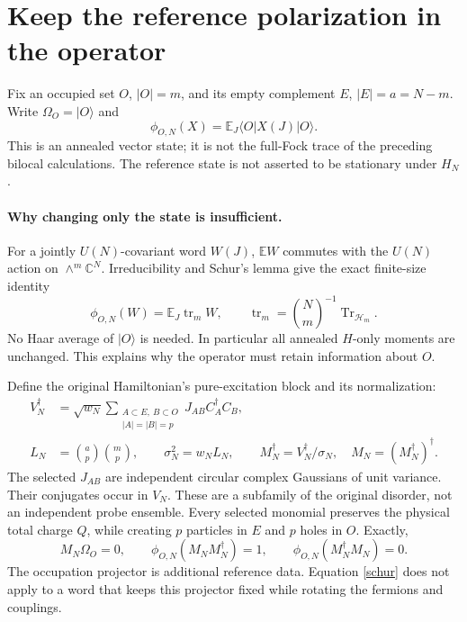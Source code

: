 \documentclass[11pt]{article}
\newcommand{\EE}{\mathbb E}
\newcommand{\tr}{\operatorname{tr}}
\newcommand{\Om}{\Omega_O}
\begin{document}
\newpage
\section{Keep the reference polarization in the operator}
Fix an occupied set $O$, $|O|=m$, and its empty complement $E$,
$|E|=a=N-m$. Write $\Om=|O\rangle$ and
\begin{equation}\label{state}
 \phi_{O,N}(X)=\EE_J\langle O|X(J)|O\rangle.
\end{equation}
This is an annealed vector state; it is not the full-Fock trace of the
preceding bilocal calculations. The reference state is not asserted
to be stationary under $H_N$.

\paragraph{Why changing only the state is insufficient.}
For a jointly $U(N)$-covariant word $W(J)$, $\EE W$ commutes with
the $U(N)$ action on $\wedge^m\mathbb C^N$. Irreducibility and Schur's
lemma give the exact finite-size identity
\begin{equation}\label{schur}
 \phi_{O,N}(W)=\EE_J\tr_m W,
 \qquad \tr_m=\binom Nm^{-1}\operatorname{Tr}_{\mathcal H_m}.
\end{equation}
No Haar average of $|O\rangle$ is needed. In particular all annealed
$H$-only moments are unchanged. This explains why the operator must
retain information about $O$.

Define the original Hamiltonian's pure-excitation block and its normalization:
\begin{align}
 V_N^\dagger&=\sqrt{w_N}
 \sum_{\substack{A\subset E,\ B\subset O\\|A|=|B|=p}}
 J_{AB}C_A^\dagger C_B,\label{block}\\
 L_N&=\binom ap\binom mp,\qquad
 \sigma_N^2=w_NL_N,\qquad
 M_N^\dagger=V_N^\dagger/\sigma_N,\quad M_N=(M_N^\dagger)^\dagger.
 \label{normalize}
\end{align}
The selected $J_{AB}$ are independent circular complex Gaussians of
unit variance. Their conjugates occur in $V_N$. These are a subfamily
of the original disorder, not an independent probe ensemble.
Every selected monomial preserves the physical total charge $Q$,
while creating $p$ particles in $E$ and $p$ holes in $O$. Exactly,
\begin{equation}\label{vac}
 M_N\Om=0,\qquad
 \phi_{O,N}(M_NM_N^\dagger)=1,\qquad
 \phi_{O,N}(M_N^\dagger M_N)=0.
\end{equation}
The occupation projector is additional reference data. Equation
\eqref{schur} does not apply to a word that keeps this projector fixed
while rotating the fermions and couplings.
\end{document}
